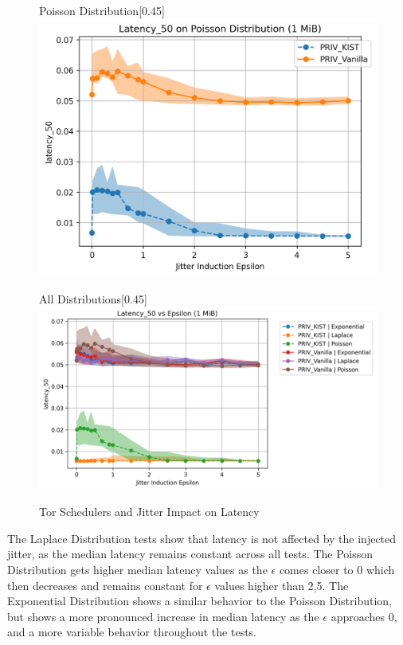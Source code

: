 \begin{figure}[htbp]
\begin{subcaptionbox}{Poisson Distribution\label{fig:jitter_latency_poisson}}[0.45\textwidth]
        {\includegraphics[width=\linewidth]{Chapters/Figures/Plots/Jitter/latency_jitter_Poisson_1_mib.png}}
    \end{subcaptionbox}
    \hfill
    \begin{subcaptionbox}{All Distributions\label{fig:jitter_latency_all}}[0.45\textwidth]
        {\includegraphics[width=\linewidth]{Chapters/Figures/Plots/Jitter/latency_jitter_1_mib.png}}
    \end{subcaptionbox}
    \caption{Tor Schedulers and Jitter Impact on Latency}\label{fig:jitter_latency_analysis}
\end{figure}

The Laplace Distribution tests show that latency is not affected by the injected jitter, as the median latency remains constant across all tests. 
The Poisson Distribution gets higher median latency values as the $\epsilon$ comes closer to 0 which then decreases and remains constant for $\epsilon$ values higher than 2,5.
The Exponential Distribution shows a similar behavior to the Poisson Distribution, but shows a more pronounced increase in median latency as the $\epsilon$ approaches 0, and a more variable behavior throughout the tests.

